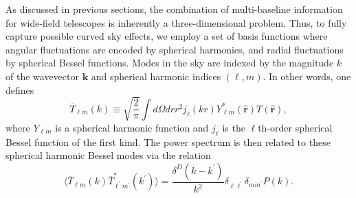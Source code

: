 \documentclass[twocolumn,apj,numberedappendix]{emulateapj}
\renewcommand\[{\begin{equation}}
\renewcommand\]{\end{equation}}
\begin{document}
As discussed in previous sections, the combination of multi-baseline information for wide-field telescopes is inherently a three-dimensional problem. Thus, to fully capture possible curved sky effects, we employ a set of basis functions where angular fluctuations are encoded by spherical harmonics, and radial fluctuations by spherical Bessel functions. Modes in the sky are indexed by the magnitude $k$ of the wavevector $\mathbf{k}$ and spherical harmonic indices $(\ell, m)$. In other words, one defines
\begin{equation}
\overline{T}_{\ell m} (k) \equiv \sqrt{\frac{2}{\pi}} \int d\Omega dr r^2 j_\ell (kr) Y_{\ell m}^* (\hat{\mathbf{r}}) T (\hat{\mathbf{r}}),
\end{equation}
where $Y_{\ell m}$ is a spherical harmonic function and $j_\ell$ is the $\ell$th-order spherical Bessel function of the first kind. The power spectrum is then related to these spherical harmonic Bessel modes via the relation
\begin{equation}
\label{eq:SHB}
\langle \overline{T}_{\ell m} (k) \overline{T}_{\ell^\prime m^\prime}^* (k^\prime) \rangle = \frac{\delta^D (k - k^\prime)}{k^2} \delta_{\ell \ell^\prime} \delta_{m m^\prime} P(k).
\end{equation}
\end{document}
